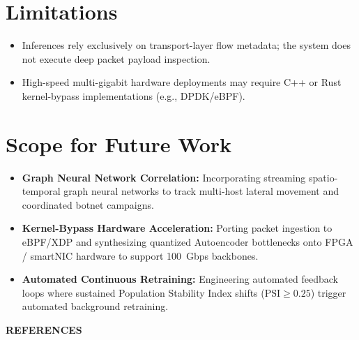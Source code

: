 \documentclass[12pt,a4paper]{report}
\begin{document}
\section{Limitations}
\begin{itemize}
    \item Inferences rely exclusively on transport-layer flow metadata; the system does not execute deep packet payload inspection.
    \item High-speed multi-gigabit hardware deployments may require C++ or Rust kernel-bypass implementations (e.g., DPDK/eBPF).
\end{itemize}

\section{Scope for Future Work}
\begin{itemize}
    \item \textbf{Graph Neural Network Correlation:} Incorporating streaming spatio-temporal graph neural networks to track multi-host lateral movement and coordinated botnet campaigns.
    \item \textbf{Kernel-Bypass Hardware Acceleration:} Porting packet ingestion to eBPF/XDP and synthesizing quantized Autoencoder bottlenecks onto FPGA / smartNIC hardware to support 100~Gbps backbones.
    \item \textbf{Automated Continuous Retraining:} Engineering automated feedback loops where sustained Population Stability Index shifts ($\text{PSI} \ge 0.25$) trigger automated background retraining.
\end{itemize}


\clearpage
\begin{center}
{\Large\bfseries REFERENCES}\\[0.6cm]
\end{center}
\end{document}
